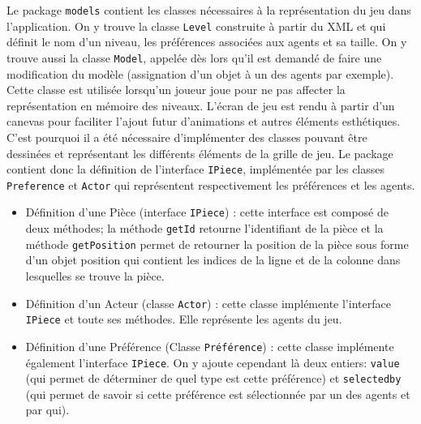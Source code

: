 \documentclass[../main.tex]{subfiles}
\begin{document}
Le package \texttt{models} contient les classes nécessaires à la représentation du jeu dans l'application. On y trouve la classe \texttt{Level} construite à partir du XML et qui définit le nom d'un niveau, les préférences associées aux agents et sa taille. On y trouve aussi la classe \texttt{Model}, appelée dès lors qu'il est demandé de faire une modification du modèle (assignation d'un objet à un des agents par exemple). Cette classe est utilisée lorsqu'un joueur joue pour ne pas affecter la représentation en mémoire des niveaux. L'écran de jeu est rendu à partir d'un canevas pour faciliter l'ajout futur d'animations et autres éléments esthétiques. C'est pourquoi il a été nécessaire d'implémenter des classes pouvant être dessinées et représentant les différents éléments de la grille de jeu. Le package contient donc la définition de l'interface \texttt{IPiece}, implémentée par les classes \texttt{Preference} et \texttt{Actor} qui représentent respectivement les préférences et les agents.
\begin{itemize}
\item Définition d'une Pièce (interface \texttt{IPiece}) : cette interface est composé de deux méthodes; la méthode \texttt{getId} retourne l'identifiant de la pièce et la méthode \texttt{getPosition} permet de retourner la position de la pièce sous forme d'un objet position qui contient les indices de la ligne et de la colonne dans lesquelles se trouve la pièce.
\item Définition d'un Acteur (classe \texttt{Actor}) : cette classe implémente l'interface \texttt{IPiece} et toute ses méthodes. Elle représente les agents du jeu.                                                                                                                                                                                                                                                                                                                                      
\item Définition d'une Préférence (Classe \texttt{Préférence}) : cette classe implémente également l’interface \texttt{IPiece}. On y ajoute cependant là deux entiers: \texttt{value} (qui permet de déterminer de quel type est cette préférence) et \texttt{selectedby} (qui permet de savoir si cette préférence est sélectionnée par un des agents et par qui). 
\end{itemize}
\end{document}
